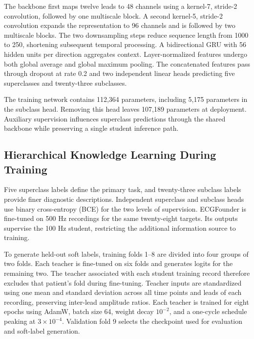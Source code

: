 \documentclass[11pt,a4paper]{article}
\begin{document}
The backbone first maps twelve leads to 48 channels using a kernel-7, stride-2 convolution, followed by one multiscale block. A second kernel-5, stride-2 convolution expands the representation to 96 channels and is followed by two multiscale blocks. The two downsampling steps reduce sequence length from 1000 to 250, shortening subsequent temporal processing. A bidirectional GRU with 56 hidden units per direction aggregates context\cite{cho2014}. Layer-normalized features undergo both global average and global maximum pooling. The concatenated features pass through dropout at rate 0.2 and two independent linear heads predicting five superclasses and twenty-three subclasses.

The training network contains 112,364 parameters, including 5,175 parameters in the subclass head. Removing this head leaves 107,189 parameters at deployment. Auxiliary supervision influences superclass predictions through the shared backbone while preserving a single student inference path.

\subsection{Hierarchical Knowledge Learning During Training}
Five superclass labels define the primary task, and twenty-three subclass labels provide finer diagnostic descriptions. Independent superclass and subclass heads use binary cross-entropy (BCE) for the two levels of supervision. ECGFounder\cite{li2025} is fine-tuned on 500 Hz recordings for the same twenty-eight targets. Its outputs supervise the 100 Hz student, restricting the additional information source to training.

To generate held-out soft labels, training folds 1--8 are divided into four groups of two folds. Each teacher is fine-tuned on six folds and generates logits for the remaining two. The teacher associated with each student training record therefore excludes that patient's fold during fine-tuning. Teacher inputs are standardized using one mean and standard deviation across all time points and leads of each recording, preserving inter-lead amplitude ratios. Each teacher is trained for eight epochs using AdamW, batch size 64, weight decay $10^{-2}$, and a one-cycle schedule peaking at $3\times10^{-4}$. Validation fold 9 selects the checkpoint used for evaluation and soft-label generation.
\end{document}

